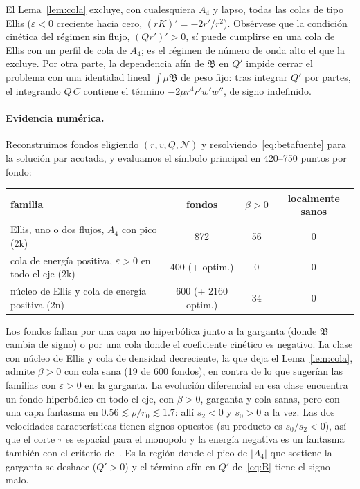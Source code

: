 \documentclass[11pt,a4paper]{article}
\theoremstyle{remark}
\newcommand{\Ncal}{\mathcal N}
\newcommand{\B}{\mathfrak B}
\begin{document}
El Lema~\ref{lem:cola} excluye, con cualesquiera $A_4$ y lapso, todas las colas de tipo Ellis ($\varepsilon<0$ creciente hacia cero, $(rK)'=-2r'/r^2$). Obsérvese que la condición cinética del régimen sin flujo, $(Qr')'>0$, sí puede cumplirse en una cola de Ellis con un perfil de cola de $A_4$; es el régimen de número de onda alto el que la excluye. Por otra parte, la dependencia afín de $\B$ en $Q'$ impide cerrar el problema con una identidad lineal $\int\mu\B$ de peso fijo: tras integrar $Q'$ por partes, el integrando $Q\,C$ contiene el término $-2\mu r^4r'w'w''$, de signo indefinido.

\paragraph{Evidencia numérica.} Reconstruimos fondos eligiendo $(r,v,Q,\Ncal)$ y resolviendo~\eqref{eq:betafuente} para la solución par acotada, y evaluamos el símbolo principal en 420--750 puntos por fondo:
\begin{center}
\small\begin{tabular}{p{6.2cm}ccc}
\toprule
familia & fondos & $\beta>0$ & localmente sanos \\
\midrule
Ellis, uno o dos flujos, $A_4$ con pico (2k) & 872 & 56 & 0 \\
cola de energía positiva, $\varepsilon>0$ en todo el eje (2k) & 400 (+ optim.) & 0 & 0 \\
núcleo de Ellis y cola de energía positiva (2n) & 600 (+ 2160 optim.) & 34 & 0 \\
\bottomrule
\end{tabular}
\end{center}
Los fondos fallan por una capa no hiperbólica junto a la garganta (donde $\B$ cambia de signo) o por una cola donde el coeficiente cinético es negativo. La clase con núcleo de Ellis y cola de densidad decreciente, la que deja el Lema~\ref{lem:cola}, admite $\beta>0$ con cola sana (19 de 600 fondos), en contra de lo que sugerían las familias con $\varepsilon>0$ en la garganta. La evolución diferencial en esa clase encuentra un fondo hiperbólico en todo el eje, con $\beta>0$, garganta y cola sanas, pero con una capa fantasma en $0.56\lesssim\rho/r_0\lesssim1.7$: allí $s_2<0$ y $s_0>0$ a la vez. Las dos velocidades características tienen signos opuestos (su producto es $s_0/s_2<0$), así que el corte $\tau$ es espacial para el monopolo y la energía negativa es un fantasma también con el criterio de~\cite{BCEL2}. Es la región donde el pico de $|A_4|$ que sostiene la garganta se deshace ($Q'>0$) y el término afín en $Q'$ de~\eqref{eq:B} tiene el signo malo.
\end{document}

